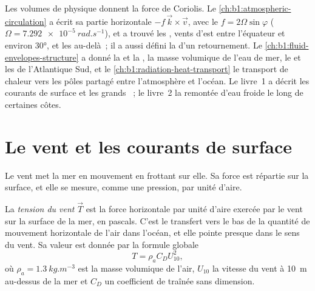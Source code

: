 \begin{recall}
Les volumes de physique donnent la force de Coriolis. Le \cref{ch:b1:atmospheric-circulation}
a écrit sa partie horizontale $-f\,\vec k\times\vec v$, avec le 
$f = 2\Omega\sin\varphi$ ($\Omega = \qty{7.292e-5}{rad.s^{-1}}$), et a trouvé les
, vents d'est entre l'équateur et environ \ang{30}, et les 
au-delà~; il a aussi défini la  d'un retournement.
Le \cref{ch:b1:fluid-envelopes-structure} a donné la  et la , la
masse volumique de l'eau de mer, le  et les  de l'Atlantique Sud,
et le \cref{ch:b1:radiation-heat-transport} le transport de chaleur vers les pôles partagé entre
l'atmosphère et l'océan. Le livre~1 a décrit les courants de surface et les grands
~; le livre~2 la remontée d'eau froide le long de certaines côtes.
\end{recall}

\section{Le vent et les courants de surface}\label{sec:b1:ocean-circulation:wind}

Le vent met la mer en mouvement en frottant sur elle. Sa force est répartie sur la surface, et
elle se mesure, comme une pression, par unité d'aire.

\begin{definition}\label{def:b1:ocean-circulation:wind-stress}
La \emph{tension du vent} $\vec T$ est la force horizontale par unité
d'aire exercée par le vent sur la surface de la mer, en pascals. C'est le transfert vers le bas
de la quantité de mouvement horizontale de l'air dans l'océan, et elle pointe presque dans le sens du
vent. Sa valeur est donnée par la formule globale
\[
  T = \rho_a C_D U_{10}^2,
\]
où $\rho_a = \qty{1.3}{kg.m^{-3}}$ est la masse volumique de l'air, $U_{10}$ la vitesse du vent
à \qty{10}{m} au-dessus de la mer et $C_D$ un coefficient de traînée sans dimension.
\end{definition}

